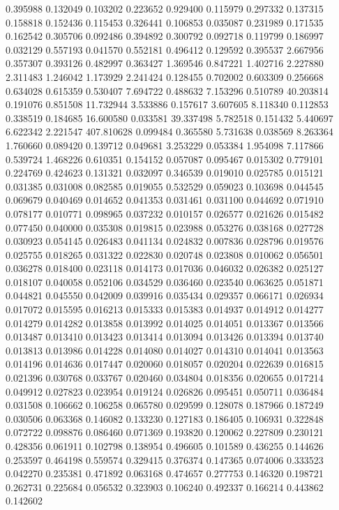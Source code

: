0.395988
0.132049
0.103202
0.223652
0.929400
0.115979
0.297332
0.137315
0.158818
0.152436
0.115453
0.326441
0.106853
0.035087
0.231989
0.171535
0.162542
0.305706
0.092486
0.394892
0.300792
0.092718
0.119799
0.186997
0.032129
0.557193
0.041570
0.552181
0.496412
0.129592
0.395537
2.667956
0.357307
0.393126
0.482997
0.363427
1.369546
0.847221
1.402716
2.227880
2.311483
1.246042
1.173929
2.241424
0.128455
0.702002
0.603309
0.256668
0.634028
0.615359
0.530407
7.694722
0.488632
7.153296
0.510789
40.203814
0.191076
0.851508
11.732944
3.533886
0.157617
3.607605
8.118340
0.112853
0.338519
0.184685
16.600580
0.033581
39.337498
5.782518
0.151432
5.440697
6.622342
2.221547
407.810628
0.099484
0.365580
5.731638
0.038569
8.263364
1.760660
0.089420
0.139712
0.049681
3.253229
0.053384
1.954098
7.117866
0.539724
1.468226
0.610351
0.154152
0.057087
0.095467
0.015302
0.779101
0.224769
0.424623
0.131321
0.032097
0.346539
0.019010
0.025785
0.015121
0.031385
0.031008
0.082585
0.019055
0.532529
0.059023
0.103698
0.044545
0.069679
0.040469
0.014652
0.041353
0.031461
0.031100
0.044692
0.071910
0.078177
0.010771
0.098965
0.037232
0.010157
0.026577
0.021626
0.015482
0.077450
0.040000
0.035308
0.019815
0.023988
0.053276
0.038168
0.027728
0.030923
0.054145
0.026483
0.041134
0.024832
0.007836
0.028796
0.019576
0.025755
0.018265
0.031322
0.022830
0.020748
0.023808
0.010062
0.056501
0.036278
0.018400
0.023118
0.014173
0.017036
0.046032
0.026382
0.025127
0.018107
0.040058
0.052106
0.034529
0.036460
0.023540
0.063625
0.051871
0.044821
0.045550
0.042009
0.039916
0.035434
0.029357
0.066171
0.026934
0.017072
0.015595
0.016213
0.015333
0.015383
0.014937
0.014912
0.014277
0.014279
0.014282
0.013858
0.013992
0.014025
0.014051
0.013367
0.013566
0.013487
0.013410
0.013423
0.013414
0.013094
0.013426
0.013394
0.013740
0.013813
0.013986
0.014228
0.014080
0.014027
0.014310
0.014041
0.013563
0.014196
0.014636
0.017447
0.020060
0.018057
0.020204
0.022639
0.016815
0.021396
0.030768
0.033767
0.020460
0.034804
0.018356
0.020655
0.017214
0.049912
0.027823
0.023954
0.019124
0.026826
0.095451
0.050711
0.036484
0.031508
0.106662
0.106258
0.065780
0.029599
0.128078
0.187966
0.187249
0.030506
0.063368
0.146082
0.133230
0.127183
0.186405
0.106931
0.322848
0.072722
0.098876
0.086460
0.071369
0.193820
0.120062
0.227809
0.230121
0.428356
0.061911
0.102798
0.138954
0.496605
0.101589
0.436255
0.144626
0.253597
0.464198
0.559574
0.329415
0.376374
0.147365
0.074006
0.333523
0.042270
0.235381
0.471892
0.063168
0.474657
0.277753
0.146320
0.198721
0.262731
0.225684
0.056532
0.323903
0.106240
0.492337
0.166214
0.443862
0.142602
